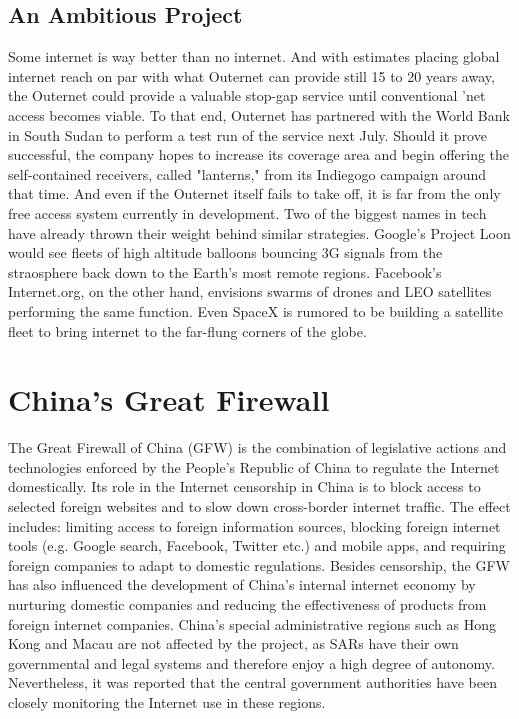 \documentclass[10pt,conference,a4paper]{IEEEtran}%
\begin{document}
\subsection{An Ambitious Project}
Some internet is way better than no internet. And with estimates placing global internet reach on par with what Outernet can provide still 15 to 20 years away, the Outernet could provide a valuable stop-gap service until conventional 'net access becomes viable.
To that end, Outernet has partnered with the World Bank in South Sudan to perform a test run of the service next July. Should it prove successful, the company hopes to increase its coverage area and begin offering the self-contained receivers, called "lanterns," from its Indiegogo campaign around that time.
And even if the Outernet itself fails to take off, it is far from the only free access system currently in development. Two of the biggest names in tech have already thrown their weight behind similar strategies. Google's Project Loon would see fleets of high altitude balloons bouncing 3G signals from the straosphere back down to the Earth's most remote regions. Facebook's Internet.org, on the other hand, envisions swarms of drones and LEO satellites performing the same function. Even SpaceX is rumored to be building a satellite fleet to bring internet to the far-flung corners of the globe.

\section{China's Great Firewall}
The Great Firewall of China (GFW) is the combination of legislative actions and technologies enforced by the People's Republic of China to regulate the Internet domestically. Its role in the Internet censorship in China is to block access to selected foreign websites and to slow down cross-border internet traffic. The effect includes: limiting access to foreign information sources, blocking foreign internet tools (e.g. Google search, Facebook, Twitter etc.) and mobile apps, and requiring foreign companies to adapt to domestic regulations. Besides censorship, the GFW has also influenced the development of China's internal internet economy by nurturing domestic companies and reducing the effectiveness of products from foreign internet companies.
China's special administrative regions such as Hong Kong and Macau are not affected by the project, as SARs have their own governmental and legal systems and therefore enjoy a high degree of autonomy. Nevertheless, it was reported that the central government authorities have been closely monitoring the Internet use in these regions.
\end{document}
